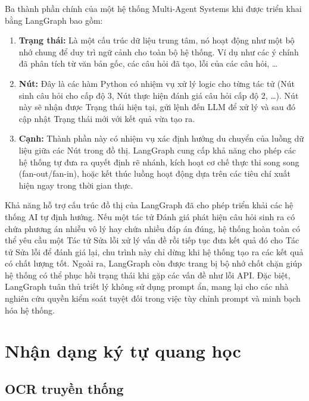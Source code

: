 Ba thành phần chính của một hệ thống Multi-Agent Systems khi được triển khai bằng LangGraph bao gồm:

\begin{enumerate}

    \item \textbf{Trạng thái: }Là một cấu trúc dữ liệu trung tâm, nó hoạt động như một bộ nhớ chung để duy trì ngữ cảnh cho toàn bộ hệ thống. Ví dụ như các ý chính đã phân tích từ văn bản gốc, các câu hỏi đã tạo, lỗi của các câu hỏi, …
    
    \item \textbf{Nút:} Đây là các hàm Python có nhiệm vụ xử lý logic cho từng tác tử (Nút sinh câu hỏi cho cấp độ 3, Nút thực hiện đánh giá câu hỏi cấp độ 2, …). Nút này sẽ nhận được Trạng thái hiện tại, gửi lệnh đến LLM để xử lý và sau đó cập nhật Trạng thái mới với kết quả vừa tạo ra.
    
    \item \textbf{Cạnh:} Thành phần này có nhiệm vụ xác định hướng du chuyển của luồng dữ liệu giữa các Nút trong đồ thị. LangGraph cung cấp khả năng cho phép các hệ thống tự đưa ra quyết định rẽ nhánh, kích hoạt cơ chế thực thi song song (fan-out/fan-in), hoặc kết thúc luồng hoạt động dựa trên các tiêu chí xuất hiện ngay trong thời gian thực.

\end{enumerate}

Khả năng hỗ trợ cấu trúc đồ thị của LangGraph đã cho phép triển khải các hệ thống AI tự định hướng. Nếu một tác tử Đánh giá phát hiện câu hỏi sinh ra có chứa phương án nhiễu vô lý hay chứa nhiều đáp án đúng, hệ thống hoàn toàn có thể yêu cầu một Tác tử Sửa lỗi xử lý vấn đề rồi tiếp tục đưa kết quả đó cho Tác tử Sửa lỗi để đánh giá lại, chu trình này chỉ dừng khi hệ thống tạo ra các kết quả có chất lượng tốt. Ngoài ra, LangGraph còn được trang bị bộ nhớ chốt chặn giúp hệ thống có thể phục hồi trạng thái khi gặp các vấn đề như lỗi API. Đặc biệt, LangGraph tuân thủ triết lý không sử dụng prompt ẩn, mang lại cho các nhà nghiên cứu quyền kiểm soát tuyệt đối trong việc tùy chỉnh prompt và minh bạch hóa hệ thống.


\section{Nhận dạng ký tự quang học}
\subsection{OCR truyền thống}

